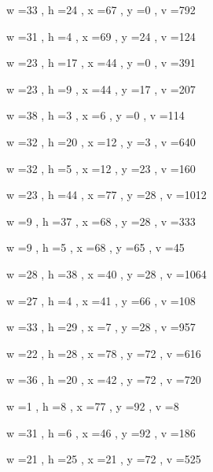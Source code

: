 \documentclass[11pt]{article}
\begin{document}
w =33 , h =24 , x =67 , y =0 , v =792
\par
w =31 , h =4 , x =69 , y =24 , v =124
\par
w =23 , h =17 , x =44 , y =0 , v =391
\par
w =23 , h =9 , x =44 , y =17 , v =207
\par
w =38 , h =3 , x =6 , y =0 , v =114
\par
w =32 , h =20 , x =12 , y =3 , v =640
\par
w =32 , h =5 , x =12 , y =23 , v =160
\par
w =23 , h =44 , x =77 , y =28 , v =1012
\par
w =9 , h =37 , x =68 , y =28 , v =333
\par
w =9 , h =5 , x =68 , y =65 , v =45
\par
w =28 , h =38 , x =40 , y =28 , v =1064
\par
w =27 , h =4 , x =41 , y =66 , v =108
\par
w =33 , h =29 , x =7 , y =28 , v =957
\par
w =22 , h =28 , x =78 , y =72 , v =616
\par
w =36 , h =20 , x =42 , y =72 , v =720
\par
w =1 , h =8 , x =77 , y =92 , v =8
\par
w =31 , h =6 , x =46 , y =92 , v =186
\par
w =21 , h =25 , x =21 , y =72 , v =525
\par
\newpage
\end{document}
